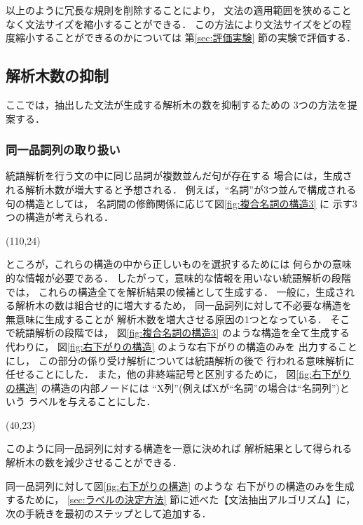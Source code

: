 以上のように冗長な規則を削除することにより，
文法の適用範囲を狭めることなく文法サイズを縮小することができる．
この方法により文法サイズをどの程度縮小することができるのかについては
第\ref{sec:評価実験} 節の実験で評価する．
\subsection{解析木数の抑制}
\label{sec:解析木数の抑制}

ここでは，抽出した文法が生成する解析木の数を抑制するための
3つの方法を提案する．
\subsubsection{同一品詞列の取り扱い}
\label{sec:同一品詞列}

統語解析を行う文の中に同じ品詞が複数並んだ句が存在する
場合には，生成される解析木数が増大すると予想される．
例えば，``名詞''が3つ並んで構成される句の構造としては，
名詞間の修飾関係に応じて図\ref{fig:複合名詞の構造3} に
示す3つの構造が考えられる．
\begin{center}
  \atari(110,24)
\end{center}

ところが，これらの構造の中から正しいものを選択するためには
何らかの意味的な情報が必要である\cite{kobayashi96a}．
したがって，意味的な情報を用いない統語解析の段階では，
これらの構造全てを解析結果の候補として生成する．
一般に，生成される解析木の数は組合せ的に増大するため，
同一品詞列に対して不必要な構造を無意味に生成することが
解析木数を増大させる原因の1つとなっている．
そこで統語解析の段階では，
図\ref{fig:複合名詞の構造3} のような構造を全て生成する代わりに，
図\ref{fig:右下がりの構造} のような右下がりの構造のみを
出力することにし，
この部分の係り受け解析については統語解析の後で
行われる意味解析に任せることにした．
また，他の非終端記号と区別するために，
図\ref{fig:右下がりの構造} の構造の内部ノードには
``X列''(例えばXが``名詞''の場合は``名詞列'')という
ラベルを与えることにした．

\begin{center}
  \atari(40,23)
\end{center}

\noindent
このように同一品詞列に対する構造を一意に決めれば
解析結果として得られる解析木の数を減少させることができる．

同一品詞列に対して図\ref{fig:右下がりの構造} のような
右下がりの構造のみを生成するために，
\ref{sec:ラベルの決定方法} 節に述べた【文法抽出アルゴリズム】に，
次の手続きを最初のステップとして追加する．

